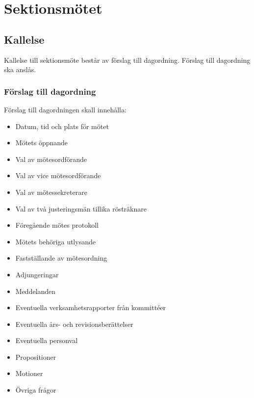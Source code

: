 \section{Sektionsmötet}

\subsection{Kallelse} 
Kallelse till sektionsmöte består av förslag till dagordning. Förslag till
dagordning ska anslås.

\subsubsection{Förslag till dagordning}
Förslag till dagordningen skall innehålla:
\begin{itemize}  
  \item Datum, tid och plats för mötet 
  \item Mötets öppnande 
  \item Val av mötesordförande
  \item Val av vice mötesordförande
  \item Val av mötessekreterare 
  \item Val av två justeringsmän tillika rösträknare 
  \item Föregående mötes protokoll
  \item Mötets behöriga utlysande 
  \item Fastställande av mötesordning 
  \item Adjungeringar 
  \item Meddelanden 
  \item Eventuella verksamhetsrapporter från kommittéer 
  \item Eventuella års- och revisionsberättelser 
  \item Eventuella personval 
  \item Propositioner 
  \item Motioner 
  \item Övriga frågor 
\end{itemize}
